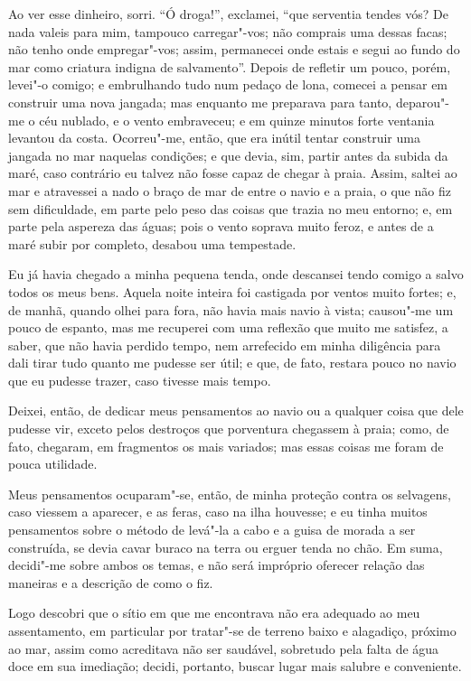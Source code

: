 Ao ver esse dinheiro, sorri. ``Ó droga!'', exclamei, ``que serventia
tendes vós? De nada valeis para mim, tampouco carregar"-vos; não comprais
uma dessas facas; não tenho onde empregar"-vos; assim, permanecei onde
estais e segui ao fundo do mar como criatura indigna de salvamento''.
Depois de refletir um pouco, porém, levei"-o comigo; e embrulhando tudo
num pedaço de lona, comecei a pensar em construir uma nova jangada; mas
enquanto me preparava para tanto, deparou"-me o céu nublado, e o vento
embraveceu; e em quinze minutos forte ventania levantou da costa.
Ocorreu"-me, então, que era inútil tentar construir uma jangada no mar
naquelas condições; e que devia, sim, partir antes da subida da maré,
caso contrário eu talvez não fosse capaz de chegar à praia. Assim,
saltei ao mar e atravessei a nado o braço de mar de entre o navio e a
praia, o que não fiz sem dificuldade, em parte pelo peso das coisas que
trazia no meu entorno; e, em parte pela aspereza das águas; pois o vento
soprava muito feroz, e antes de a maré subir por completo, desabou uma
tempestade.

Eu já havia chegado a minha pequena tenda, onde descansei tendo comigo a
salvo todos os meus bens. Aquela noite inteira foi castigada por ventos
muito fortes; e, de manhã, quando olhei para fora, não havia mais navio
à vista; causou"-me um pouco de espanto, mas me recuperei com uma
reflexão que muito me satisfez, a saber, que não havia perdido tempo,
nem arrefecido em minha diligência para dali tirar tudo quanto me
pudesse ser útil; e que, de fato, restara pouco no navio que eu pudesse
trazer, caso tivesse mais tempo.

Deixei, então, de dedicar meus pensamentos ao navio ou a qualquer coisa
que dele pudesse vir, exceto pelos destroços que porventura chegassem à
praia; como, de fato, chegaram, em fragmentos os mais variados; mas
essas coisas me foram de pouca utilidade.

Meus pensamentos ocuparam"-se, então, de minha proteção contra os
selvagens, caso viessem a aparecer, e as feras, caso na ilha houvesse; e
eu tinha muitos pensamentos sobre o método de levá"-la a cabo e a guisa
de morada a ser construída, se devia cavar buraco na terra ou erguer
tenda no chão. Em suma, decidi"-me sobre ambos os temas, e não será
impróprio oferecer relação das maneiras e a descrição de como o fiz.

Logo descobri que o sítio em que me encontrava não era adequado ao meu
assentamento, em particular por tratar"-se de terreno baixo e alagadiço,
próximo ao mar, assim como acreditava não ser saudável, sobretudo pela
falta de água doce em sua imediação; decidi, portanto, buscar lugar mais
salubre e conveniente.

